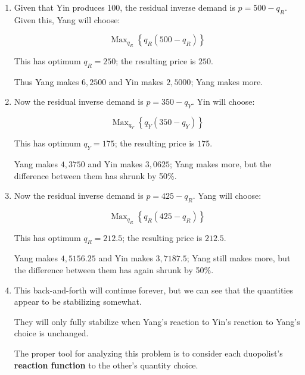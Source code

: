 \documentclass{article}
\DeclareMathOperator*{\Max}{Max}
\newenvironment{solution}{\color{red}}{\color{black}}
\begin{document}
\begin{solution}
\begin{enumerate}
\item Given that Yin produces 100, the residual inverse demand is $p = 500 - q_R$. Given this, Yang will choose:

\[ \Max_{q_R} \left\{ q_R (500 - q_R) \right\} \]

This has optimum $q_R = 250$; the resulting price is $250$.

Thus Yang makes $6,2500$ and Yin makes $2,5000$; Yang makes more.

\item Now the residual inverse demand is $p = 350 - q_Y$. Yin will choose:

\[ \Max_{q_Y} \left\{ q_Y (350 - q_Y) \right\} \]

This has optimum $q_Y = 175$; the resulting price is $175$.

Yang makes $4,3750$ and Yin makes $3,0625$; Yang makes more, but the difference between them has shrunk by 50\%.

\item Now the residual inverse demand is $p = 425 - q_R$. Yang will choose:

\[ \Max_{q_R} \left\{ q_R (425 - q_R) \right\} \]

This has optimum $q_R = 212.5$; the resulting price is $212.5$.

Yang makes $4,5156.25$ and Yin makes $3,7187.5$; Yang still makes more, but the difference between them has again shrunk by 50\%.

\item This back-and-forth will continue forever, but we can see that the quantities appear to be stabilizing somewhat. 

They will only fully stabilize when Yang's reaction to Yin's reaction to Yang's choice is unchanged.

The proper tool for analyzing this problem is to consider each duopolist's \textbf{reaction function} to the other's quantity choice. 
\end{enumerate}

\end{solution}
\end{document}
